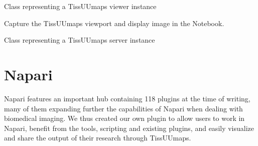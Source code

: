 \documentclass[letterpaper,10pt,english,openany,oneside]{sphinxmanual}
\begin{document}

\begin{fulllineitems}
\label{\detokenize{docs/advanced/jupyter:tissuumaps.jupyter.TissUUmapsViewer}}
\pysigstartsignatures
{}
\pysigstopsignatures
\sphinxAtStartPar
Class representing a TissUUmaps viewer instance

\begin{fulllineitems}
\label{\detokenize{docs/advanced/jupyter:tissuumaps.jupyter.TissUUmapsViewer.screenshot}}
\pysigstartsignatures
{}
\pysigstopsignatures
\sphinxAtStartPar
Capture the TissUUmaps viewport and display image in the Notebook.

\end{fulllineitems}


\end{fulllineitems}


\begin{fulllineitems}
\label{\detokenize{docs/advanced/jupyter:tissuumaps.jupyter.TissUUmapsServer}}
\pysigstartsignatures
{}
\pysigstopsignatures
\sphinxAtStartPar
Class representing a TissUUmaps server instance

\end{fulllineitems}


\sphinxstepscope


\section{Napari}
\label{\detokenize{docs/advanced/napari:napari}}\label{\detokenize{docs/advanced/napari::doc}}
\sphinxAtStartPar
Napari features an important hub containing 118 plugins at the time of writing, many of them expanding further the capabilities of Napari when dealing with biomedical imaging. We thus created our own plugin to allow users to work in Napari, benefit from the tools, scripting and existing plugins, and easily visualize and share the output of their research through TissUUmaps.
\end{document}
